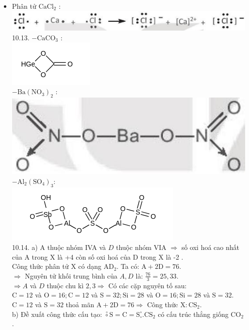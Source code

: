 \documentclass[10pt]{article}
\begin{document}
\begin{itemize}
  \item Phân tử $\mathrm{CaCl}_{2}$ :\\
\includegraphics[max width=\textwidth, center]{2025_10_23_ee735750217b2aca435cg-24(1)}\\
10.13. $-\mathrm{CaCO}_{3}$ :\\
\includegraphics{smile-175b6c8036196aed62008b980eed9df51d3246d7}\\
$-\mathrm{Ba}\left(\mathrm{NO}_{3}\right)_{2}$ :\\
\includegraphics[max width=\textwidth, center]{2025_10_23_ee735750217b2aca435cg-24}\\
$-\mathrm{Al}_{2}\left(\mathrm{SO}_{4}\right)_{3}:$\\
\includegraphics{smile-8ea47c5ac04851accf586b0e33dd3d54a4e29bb1}\\
10.14. a) A thuộc nhóm IVA và $D$ thuộc nhóm VIA $\Rightarrow$ số oxi hoá cao nhất của A trong X là +4 còn số oxi hoá của D trong X là -2 .\\
Công thức phân tử X có dạng $\mathrm{AD}_{2}$. Ta có: $\mathrm{A}+2 \mathrm{D}=76$.\\
$\Rightarrow$ Nguyên tử khối trung bình của $A, D$ là: $\frac{76}{3}=25,33$.\\
$\Rightarrow A$ và $D$ thuộc chu kì $2,3 \Rightarrow$ Có các cặp nguyên tố sau:\\
$\mathrm{C}=12$ và $\mathrm{O}=16 ; \mathrm{C}=12$ và $\mathrm{S}=32 ; \mathrm{Si}=28$ và $\mathrm{O}=16 ; \mathrm{Si}=28$ và $\mathrm{S}=32$.\\
$\mathrm{C}=12$ và $\mathrm{S}=32$ thoả mãn $\mathrm{A}+2 \mathrm{D}=76 \Rightarrow$ Công thức $\mathrm{X}: \mathrm{CS}_{2}$.\\
b) Đề xuất công thức cấu tạo: $\stackrel{\circ}{\circ} \mathrm{S}=\mathrm{C}=\mathrm{S}_{\circ}^{\circ} . \mathrm{CS}_{2}$ có cấu trúc thẳng giống $\mathrm{CO}_{2}$.
\end{itemize}
\end{document}
